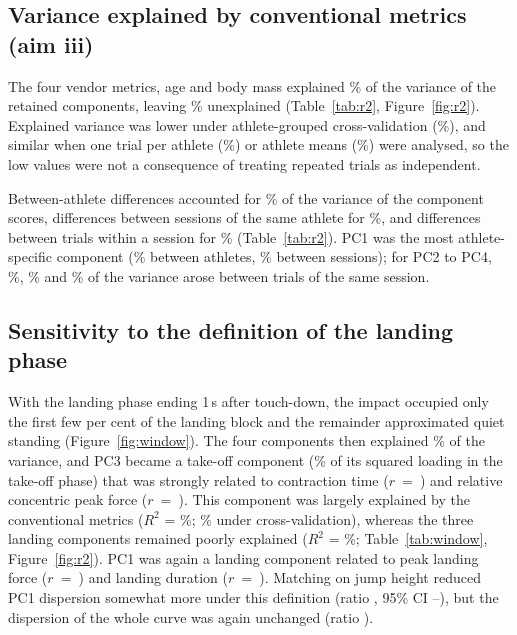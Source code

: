 


\subsection{Variance explained by conventional metrics (aim iii)}

The four vendor metrics, age and body mass explained \rtwoRange\% of the variance of the retained components, leaving \unexplRange\% unexplained (Table~\ref{tab:r2}, Figure~\ref{fig:r2}). Explained variance was lower under athlete-grouped cross-validation (\cvRange\%), and similar when one trial per athlete (\oneTrialRange\%) or athlete means (\athMeanRange\%) were analysed, so the low values were not a consequence of treating repeated trials as independent.



Between-athlete differences accounted for \betweenRange\% of the variance of the component scores, differences between sessions of the same athlete for \sessRange\%, and differences between trials within a session for \withinRange\% (Table~\ref{tab:r2}). PC1 was the most athlete-specific component (\betweenPCA\% between athletes, \sessPCA\% between sessions); for PC2 to PC4, \withinPCB\%, \withinPCC\% and \withinPCD\% of the variance arose between trials of the same session.



\subsection{Sensitivity to the definition of the landing phase}

With the landing phase ending 1\,s after touch-down, the impact occupied only the first few per cent of the landing block and the remainder approximated quiet standing (Figure~\ref{fig:window}). The four components then explained \cumFourS\% of the variance, and PC3 became a take-off component (\ldsSPCCtakeoff\% of its squared loading in the take-off phase) that was strongly related to contraction time ($r$~=~\rCtSPCC) and relative concentric peak force ($r$~=~\rRpfSPCC). This component was largely explained by the conventional metrics ($R^2$ = \rtwoSPCC\%; \cvSPCC\% under cross-validation), whereas the three landing components remained poorly explained ($R^2$ = \rtwoLandingSRange\%; Table~\ref{tab:window}, Figure~\ref{fig:r2}). PC1 was again a landing component related to peak landing force ($r$~=~\rLpfSPCA) and landing duration ($r$~=~\rLdSPCA). Matching on jump height reduced PC1 dispersion somewhat more under this definition (ratio \jhRatioSPCA, 95\% CI \jhLoSPCA--\jhHiSPCA), but the dispersion of the whole curve was again unchanged (ratio \wholeJhS).

